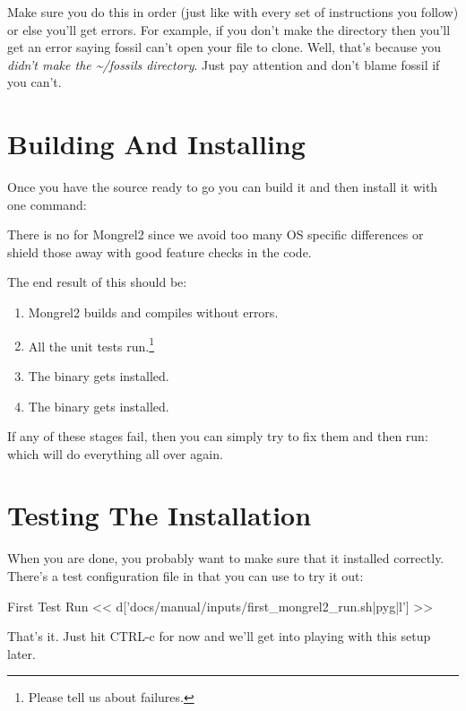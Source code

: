 Make sure you do this in order (just like with every set of instructions you follow)
or else you'll get errors.  For example, if you don't make the  directory
then you'll get an error saying fossil can't open your file to clone.  Well, that's because
you \emph{didn't make the \~{}/fossils directory}.  Just pay attention and don't blame fossil
if you can't.




\section{Building And Installing}

Once you have the source ready to go you can build it and then install it with
one command:  

There is no  for Mongrel2 since we avoid too many OS specific
differences or shield those away with good feature checks in the code.

The end result of this should be:

\begin{enumerate}
\item Mongrel2 builds and compiles without errors.
\item All the unit tests run.\footnote{Please tell us about failures.}
\item The  binary gets installed.
\item The  binary gets installed.
\end{enumerate}

If any of these stages fail, then you can simply try to fix them and then
run:   which will do everything all over again.

\section{Testing The Installation}

When you are done, you probably want to make sure that it installed correctly.
There's a test configuration file in  that you can
use to try it out:

\begin{code}{First Test Run}
<< d['docs/manual/inputs/first_mongrel2_run.sh|pyg|l'] >>
\end{code}

That's it.  Just hit CTRL-c for now and we'll get into playing with this
setup later.

